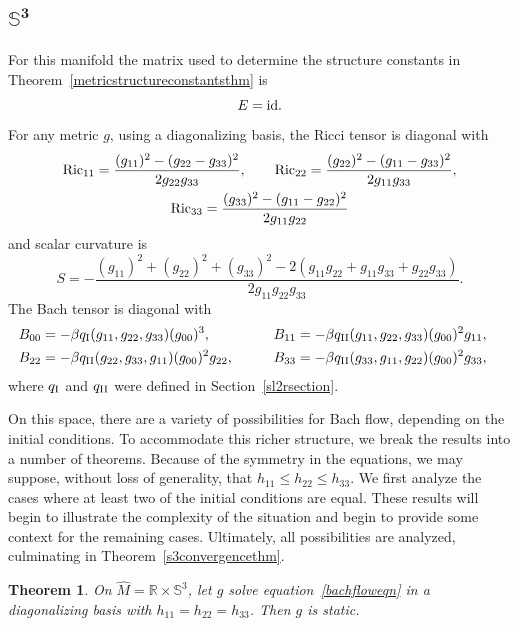 \documentclass[pdftex]{sigma}
\numberwithin{equation}{section}
\newtheorem{Theorem}{Theorem}[section]
\begin{document}
\subsection[$\mathbb{S}^3$]{$\boldsymbol{\mathbb{S}^3}$}

For this manifold the matrix used to determine the structure constants in Theorem~\ref{metricstructureconstantsthm} is
\[
E = {\rm id}.
\]
For any metric $g$, using a diagonalizing basis, the Ricci tensor is diagonal with
\begin{gather*}
{\rm Ric}_{11} = \frac{(g_{11})^2 - (g_{22} - g_{33})^2}{2 g_{22} g_{33}},\qquad
{\rm Ric}_{22} = \frac{(g_{22})^2 - (g_{11} - g_{33})^2}{2 g_{11} g_{33}}, \\
{\rm Ric}_{33} = \frac{(g_{33})^2 - (g_{11} - g_{22})^2}{2 g_{11} g_{22}}
\end{gather*}
and scalar curvature is
\[
S = - \frac{(g_{11})^2 + (g_{22})^2+(g_{33})^2 - 2(g_{11} g_{22} + g_{11} g_{33} + g_{22} g_{33})}
		{2 g_{11} g_{22} g_{33}}.
\]
The Bach tensor is diagonal with{\samepage
\begin{alignat*}{3}
& B_{00}= -\beta q_{\rm I}(g_{11}, g_{22}, g_{33}) (g_{00})^3 ,\qquad &&
B_{11}= -\beta q_{\rm II}(g_{11}, g_{22}, g_{33}) (g_{00})^2 g_{11}, &\\
&B_{22}= -\beta q_{\rm II}(g_{22}, g_{33}, g_{11}) (g_{00})^2 g_{22}, \qquad &&
B_{33}= -\beta q_{\rm II}(g_{33}, g_{11}, g_{22}) (g_{00})^2 g_{33},&
\end{alignat*}
where $q_{\rm I}$ and $q_{\rm II}$ were defined in Section~\ref{sl2rsection}.}

On this space, there are a variety of possibilities for Bach flow, depending on the initial conditions. To accommodate this richer structure, we break the results into a number of theorems. Because of the symmetry in the equations, we may suppose, without loss of generality, that $h_{11} \leq h_{22} \leq h_{33}$. We first analyze the cases where at least two of the initial conditions are equal. These results will begin to illustrate the complexity of the situation and begin to provide some context for the remaining cases. Ultimately, all possibilities are analyzed, culminating in Theorem~\ref{s3convergencethm}.

\begin{Theorem} \label{s3bdythm1} On $\widehat{M} = \mathbb{R} \times \mathbb{S}^3$, let $g$ solve equation~\eqref{bachfloweqn} in a diagonalizing basis with $h_{11} = h_{22} = h_{33}$. Then $g$ is static.
\end{Theorem}
\end{document}
